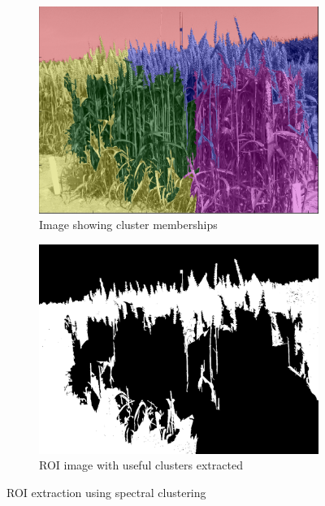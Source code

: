 \begin{figure}[ht!]
\begin{subfigure}{.5\textwidth}
\includegraphics[width=.9\linewidth,height=.7\linewidth,keepaspectratio]{clusters.png}
  \caption{Image showing cluster memberships}
  \label{fig:sub1}
\end{subfigure}%
\begin{subfigure}{.5\textwidth}
 \includegraphics[width=.9\linewidth,height=.7\linewidth,keepaspectratio]{roi.png}
  \caption{ROI image with useful clusters extracted}
  \label{fig:sub2}
\end{subfigure}
\caption{ROI extraction using spectral clustering}
\label{fig:test}
\end{figure}

